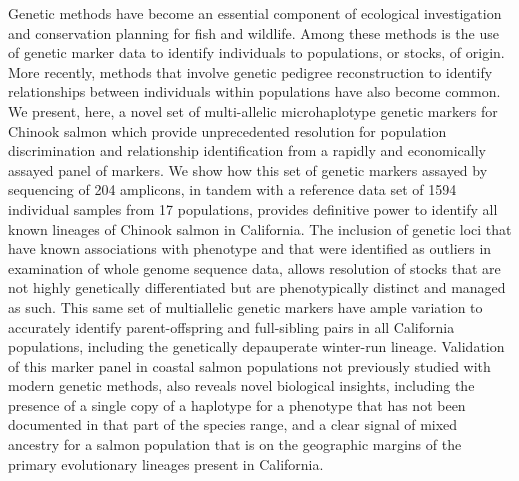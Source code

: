 

Genetic methods have become an essential component of ecological investigation
and conservation planning for fish and wildlife. Among these methods is the use
of genetic marker data to identify individuals to
populations, or stocks, of origin. More recently, methods that involve genetic
pedigree reconstruction to identify relationships between individuals within populations
have also become common. We present, here, a novel set of
multi-allelic microhaplotype genetic markers for Chinook salmon which provide unprecedented
resolution for population discrimination and relationship identification from a rapidly and
economically assayed panel of markers. We show how this set of genetic markers assayed
by sequencing of 204 amplicons, in tandem with a reference data set of 1594 individual
samples from 17 populations, 
provides definitive power to identify all known lineages of Chinook salmon in
California. The inclusion of genetic loci that have known associations with phenotype
and that were identified as outliers in examination of whole genome sequence data,
allows resolution of stocks that are not highly genetically differentiated but
are phenotypically distinct and managed as such. 
This same set of multiallelic genetic markers have ample variation to
accurately identify parent-offspring and full-sibling
pairs in all California populations, including the genetically depauperate winter-run
lineage.
Validation of this marker panel in coastal salmon populations not previously studied with
modern genetic methods, also reveals novel biological insights, including
the presence of a single copy of a haplotype for a phenotype that has not
been documented in that part of the species range, and a clear signal of mixed
ancestry for a salmon population that is on the geographic margins of the 
primary evolutionary lineages present in California.
